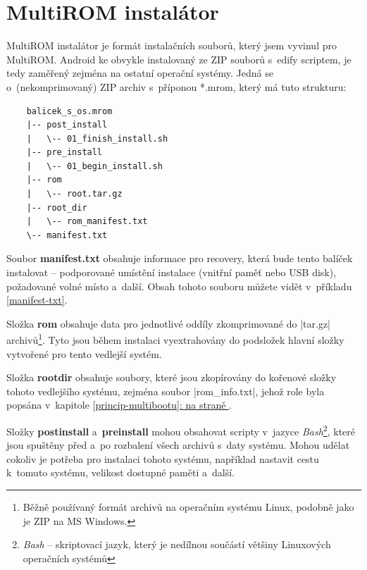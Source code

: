 \documentclass[12pt, a4paper, oneside]{article}
\newcommand{\B}{\textbf} %
\newcommand{\It}{\textit}  %
\newcommand*{\fullref}[1]{\hyperref[{#1}]{\ref*{#1}: \uv{\nameref*{#1}} na straně \pageref{#1}}}
\begin{document}
\section*{MultiROM instalátor}
\label{sec:installer}
MultiROM instalátor je formát instalačních souborů, který jsem vyvinul pro MultiROM. Android ke obvykle instalovaný ze ZIP souborů s~edify scriptem, je tedy zaměřený zejména na ostatní operační systémy. Jedná se o~(nekomprimovaný) ZIP archiv s~příponou *.mrom, který má tuto strukturu:
\begin{verbatim}
    balicek_s_os.mrom
    |-- post_install
    |   \-- 01_finish_install.sh
    |-- pre_install
    |   \-- 01_begin_install.sh
    |-- rom
    |   \-- root.tar.gz
    |-- root_dir
    |   \-- rom_manifest.txt
    \-- manifest.txt
\end{verbatim}

Soubor \B{manifest.txt} obsahuje informace pro recovery, která bude tento balíček instalovat -- podporované umístění instalace (vnitřní paměť nebo USB disk), požadované volné místo a~další. Obsah tohoto souboru můžete vidět v~příkladu \ref{manifest-txt}.

Složka \B{rom} obsahuje data pro jednotlivé oddíly zkomprimované do |tar.gz| archivů\footnote{Běžně používaný formát archivů na operačním systému Linux, podobně jako je ZIP na MS Windows.}. Tyto jsou během instalaci vyextrahovány do podsložek hlavní složky vytvořené pro tento vedlejší systém.

Složka \B{root\textunderscore dir} obsahuje soubory, které jsou zkopírovány do kořenové složky tohoto vedlejšího systému, zejména soubor |rom_info.txt|, jehož role byla popsána v~kapitole \fullref{princip-multibootu}.

Složky \B{post\textunderscore install} a~\B{pre\textunderscore install} mohou obsahovat scripty v~jazyce \It{Bash}\footnote{\It{Bash} -- skriptovací jazyk, který je nedílnou součástí většiny Linuxových operačních systémů}, které jsou spuštěny před a~po rozbalení všech archivů s~daty systému. Mohou udělat cokoliv je potřeba pro instalaci tohoto systému, například nastavit cestu k~tomuto systému, velikost dostupné paměti a~další.
\end{document}
